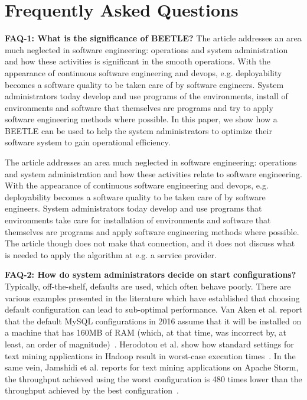 \documentclass[10pt,journal,compsoc]{IEEEtran}
\begin{document}
\section{Frequently Asked Questions}

\noindent\textbf{FAQ-1: What is the significance of BEETLE?}
The article addresses an area much neglected in software engineering: operations and system administration and how these activities is significant in the smooth operations. With the appearance of continuous software engineering and devops, e.g. deployability becomes a software quality to be taken care of by software engineers. System administrators today develop and use programs of the environments, install of environments and software that themselves are programs and try to apply software engineering methods where possible. In this paper, we show how a BEETLE can be used to help the system administrators to optimize their software system to gain operational efficiency.

The article addresses an area much neglected in software engineering: operations and system administration and how these activities relate to software engineering. With the appearance of continuous software engineering and devops, e.g. deployability becomes a software quality to be taken care of by software engineers. System administrators today develop and use programs that environments take care for installation of environments and software that themselves are programs and apply software engineering methods where possible. The article though does not make that connection, and it does not discuss what is needed to apply the algorithm at e.g. a service provider.

\noindent\textbf{FAQ-2: How do system administrators decide on start configurations?}\\
Typically, off-the-shelf, defaults are used, which often behave poorly. There are various examples presented in the literature which have established that choosing default configuration can lead to sub-optimal performance. Van Aken et al. report that the default MySQL
configurations in 2016 assume that it will be installed on
a machine that has 160MB of RAM (which, at that time, was
incorrect by, at least, an order of magnitude)~\cite{van2017automatic}. Herodotou
et al. show how standard settings for text mining applications in Hadoop result in worst-case execution times~\cite{herodotou2011starfish}. In
the same vein, Jamshidi et al. reports for text mining
applications on Apache Storm, the throughput achieved
using the worst configuration is 480 times lower than the
throughput achieved by the best configuration~\cite{JC:MASCOTS16}.
\end{document}
